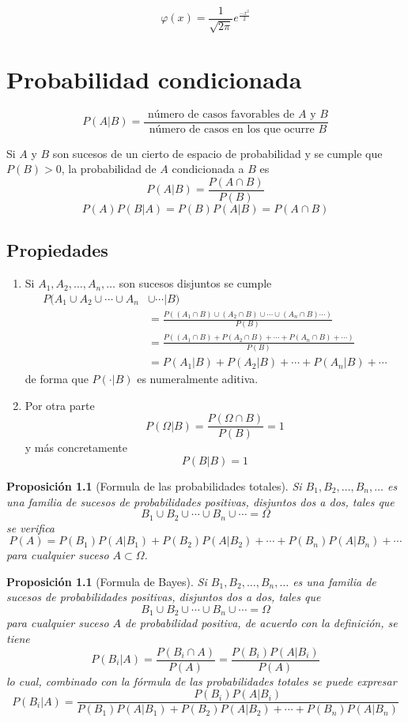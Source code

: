 \documentclass[12pt,a4paper,twoside]{memoir}
\theoremstyle{mystyle}
\newtheorem{proposition}[definition]{Proposici\'{o}n}
\begin{document}
\[
\varphi(x) = \frac{1}{\sqrt{2\pi}}e^{\frac{-x^2}{2}}
\]


\chapter{Probabilidad condicionada}

\[
  P(A|B) = \frac{\text{ número de casos favorables de } A\text{ y }B}{\text{ número de casos en los que ocurre }B}
\] 

Si \(A\) y \(B\) son sucesos de un cierto de espacio de probabilidad y se cumple que \(P(B) > 0\), la probabilidad de \(A\) condicionada a
\(B\) es 
\[
P(A|B) = \frac{P(A \cap B)}{P(B)}\] 
\[
P(A)P(B|A)=P(B)P(A|B)=P(A \cap B)
\] 

\section{Propiedades} 

\begin{enumerate}
  \item Si \(A_1,A_2,\ldots,A_n,\ldots\) son sucesos disjuntos se cumple
  \begin{align*}
    P(A_1 \cup A_2 \cup \cdots \cup A_n &\cup \cdots| B) \\&= \frac{P((A_1 \cap B) \cup (A_2 \cap B) \cup \cdots \cup (A_n \cap B)\cdots)}{P(B)} \\&= \frac{P((A_1 \cap B) + P(A_2 \cap B) + \cdots + P(A_n \cap B) + \cdots)}{P(B)} \\&= P(A_1|B) + P(A_2|B) + \cdots + P(A_n|B) + \cdots
  \end{align*}
  de forma que \(P(\cdot|B)\) es numeralmente aditiva. 
  \item Por otra parte
  \[
    P(\Omega|B)=\frac{P(\Omega \cap B)}{P(B)} = 1
  \] 
  y más concretamente 
  \[
  P(B|B) = 1
  \] 
\end{enumerate}

\begin{proposition}[Formula de las probabilidades totales]
Si \(B_1,B_2,\ldots,B_n,\ldots\) es una familia de sucesos de probabilidades positivas, disjuntos dos a dos, tales que
\[
B_1 \cup B_2 \cup \cdots \cup B_n \cup \cdots = \Omega
\]
se verifica
\[
P(A) = P(B_1)P(A|B_1) + P(B_2)P(A|B_2) + \cdots+ P(B_n)P(A|B_n) + \cdots
\]
para cualquier suceso \(A \subset \Omega\).  
\end{proposition}


\begin{proposition}[Formula de Bayes]
  Si \(B_1,B_2,\ldots,B_n,\ldots\) es una familia de sucesos de probabilidades positivas, disjuntos dos a dos, tales que 
  \[
  B_1 \cup B_2 \cup \cdots \cup B_n \cup \cdots = \Omega
  \]
  para cualquier suceso \(A\) de probabilidad positiva, de acuerdo con la definición, se tiene
  \[
  P(B_i|A) = \frac{P(B_i \cap A)}{P(A)} = \frac{P(B_i)P(A|B_i)}{P(A)}
  \]
  lo cual, combinado con la fórmula de las probabilidades totales se puede expresar
  \[
  P(B_i|A) = \frac{P(B_i)P(A|B_i)}{P(B_1)P(A|B_1) + P(B_2)P(A|B_2) + \cdots+ P(B_n)P(A|B_n)}
  \]  
\end{proposition}
\end{document}
